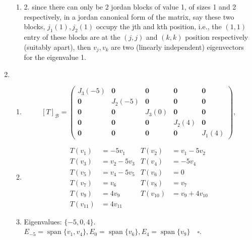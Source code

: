 \documentclass[12pt, a4paper]{article}
\DeclareMathOperator{\spn}{span}
\begin{document}
\begin{enumerate}
\begin{enumerate}
      \item 2. since there can only be 2 jordan blocks of value 1, of sizes 1
        and 2 respectively, in a jordan canonical form of the matrix, say these
        two blocks, $j_1(1),j_2(1)$ occupy the jth and kth position, i.e., the
        $(1,1)$ entry of these blocks are at the $(j,j)$ and $(k,k)$ position
        respectively (suitably apart), then $v_j,v_k$ are two (linearly
        independent) eigenvectors for the eigenvalue 1.
    \end{enumerate}
  \item
    \begin{enumerate} %
      \item
        \[ [T]_\mathcal{B} =
          \begin{pmatrix}
            J_3(-5)&\mathbf{0}&\mathbf{0}&\mathbf{0}&\mathbf{0}\\
            \mathbf{0}&J_2(-5)&\mathbf{0}&\mathbf{0}&\mathbf{0}\\
            \mathbf{0}&\mathbf{0}&J_3(0)&\mathbf{0}&\mathbf{0}\\
            \mathbf{0}&\mathbf{0}&\mathbf{0}&J_2(4)&\mathbf{0}\\
            \mathbf{0}&\mathbf{0}&\mathbf{0}&\mathbf{0}&J_1(4)
          \end{pmatrix},
        \]
      \item \[ \begin{aligned}
            T(v_1)&=-5v_1 &T(v_2)&=v_1-5v_2\\
            T(v_3)&=v_2-5v_3&T(v_4)&=-5v_4\\
            T(v_5)&=v_4-5v_5&T(v_6)&=0\\
            T(v_7)&=v_6&T(v_8)&=v_7\\
            T(v_9)&=4v_9&T(v_{10})&=v_9+4v_{10}\\
            T(v_{11})&=4v_{11}
          \end{aligned} \]

      \item Eigenvalues: $\{-5,0,4\}$.
        $E_{-5}=\spn\{v_1,v_4\},E_0=\spn\{v_6\},E_4=\spn\{v_9\}\quad\square$.
    \end{enumerate}
\end{enumerate}
\end{document}
